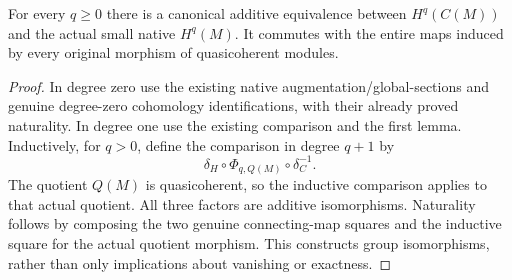 \begin{theorem}
\label{thm:scheme-module-cech-native-additive-comparison}
\leanok
{}
For every $q\geq0$ there is a canonical additive equivalence between
$H^q(C(M))$ and the actual small native $H^q(M)$. It commutes with the entire maps induced by every
original morphism of quasicoherent modules.
\end{theorem}
\begin{proof}
In degree zero use the existing native augmentation/global-sections
and genuine degree-zero cohomology identifications, with their
already proved naturality. In degree one use the existing comparison
and the first lemma. Inductively, for $q>0$, define the comparison in
degree $q+1$ by
\[
 \delta_H\circ \Phi_{q,Q(M)}\circ\delta_C^{-1}.
\]
The quotient $Q(M)$ is quasicoherent, so the inductive comparison
applies to that actual quotient. All three factors are additive
isomorphisms. Naturality follows by composing the two genuine
connecting-map squares and the inductive square for the actual
quotient morphism. This constructs group isomorphisms, rather than
only implications about vanishing or exactness.
\end{proof}

